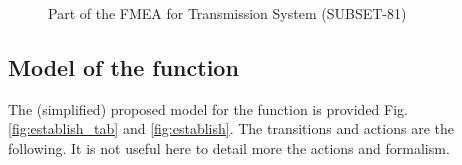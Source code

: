 \documentclass{template/openetcs_article}
\begin{document}
\begin{figure}
  \centering
  \caption{Part of the FMEA for Transmission System (SUBSET-81)}
  \label{fig:fmea}
\end{figure}

\subsection{Model of the function}
The (simplified) proposed model for the function is provided Fig. \ref{fig:establish_tab} and 
\ref{fig:establish}. The transitions and actions are the following. It is not useful here to detail
more the actions and formalism.
\end{document}
